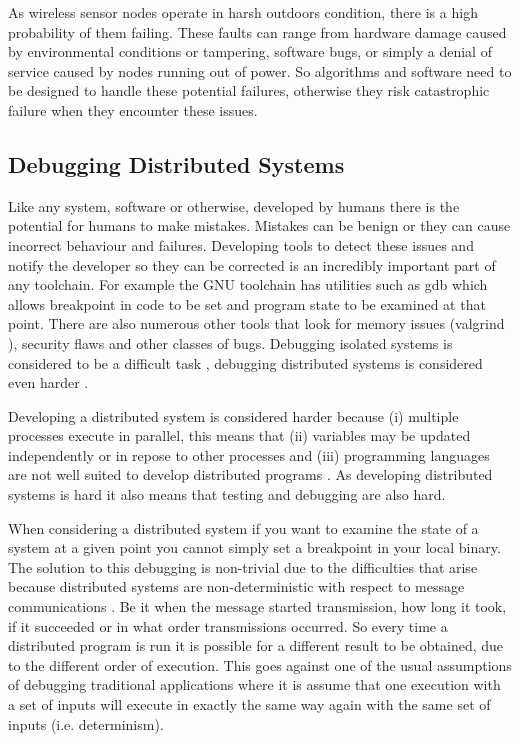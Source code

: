 As wireless sensor nodes operate in harsh outdoors condition, there is a high probability of them failing. These faults can range from hardware damage caused by environmental conditions or tampering, software bugs, or simply a denial of service caused by nodes running out of power. So algorithms and software need to be designed to handle these potential failures, otherwise they risk catastrophic failure when they encounter these issues.

\subsection{Debugging Distributed Systems}

Like any system, software or otherwise, developed by humans there is the potential for humans to make mistakes. Mistakes can be benign or they can cause incorrect behaviour and failures. Developing tools to detect these issues and notify the developer so they can be corrected is an incredibly important part of any toolchain. For example the GNU toolchain has utilities such as gdb \cite{gdb} which allows breakpoint in code to be set and program state to be examined at that point. There are also numerous other tools that look for memory issues (valgrind \cite{?}), security flaws \cite{?} and other classes of bugs. Debugging isolated systems is considered to be a difficult task \cite{5398027}, debugging distributed systems is considered even harder \cite{345831}.

Developing a distributed system is considered harder because (i) multiple processes execute in parallel, this means that (ii) variables may be updated independently or in repose to other processes and (iii) programming languages are not well suited to develop distributed programs \cite{93692,345831}. As developing distributed systems is hard it also means that testing and debugging are also hard.

When considering a distributed system if you want to examine the state of a system at a given point you cannot simply set a breakpoint in your local binary. The solution to this debugging is non-trivial due to the difficulties that arise because distributed systems are non-deterministic with respect to message communications \cite{5984212}. Be it when the message started transmission, how long it took, if it succeeded or in what order transmissions occurred. So every time a distributed program is run it is possible for a different result to be obtained, due to the different order of execution. This goes against one of the usual assumptions of debugging traditional applications where it is assume that one execution with a set of inputs will execute in exactly the same way again with the same set of inputs \cite{?} (i.e. determinism).

